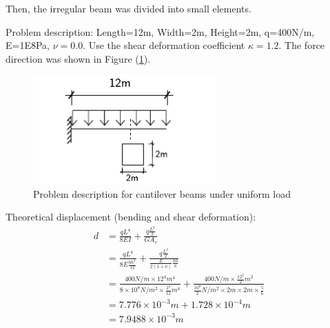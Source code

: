 \documentclass[fleqn,11pt]{article}
\begin{document}
\newpage
Then, the irregular beam was divided into small elements. 


Problem description: Length=12m, Width=2m, Height=2m, q=400N/m, E=1E8Pa, $\nu=0.0$. Use the shear deformation coefficient $\kappa=1.2$. The force direction was shown in Figure (\ref{fig Problem description for cantilever beams under uniform pressure}). 

\begin{figure}[H]
  \centering
  \includegraphics[width=7cm]{../Figure-files/cantilever_12_uniform_load.pdf}
  \caption{Problem description for cantilever beams under uniform load  }
  \label{fig Problem description for cantilever beams under uniform pressure}
\end{figure}


Theoretical displacement (bending and shear deformation):
\begin{equation}
  \begin{aligned}
  d &=\frac{qL^4}{8EI} + \frac{q \frac{L^2}{2}}{GA_v} \\ 
    &=\frac{qL^4}{8E\frac{bh^3}{12} }+\frac{q \frac{L^2}{2}}{\frac{E}{2(1+\nu)}\frac{bh}{\kappa}} \\
    &= \frac{400 N/m \times 12^4 m^4}{8\times 10^8 N/m^2 \times \frac{2^4}{12} m^4} 
       + \frac{400 N/m \times \frac{12^2}{2} m^2} {\frac{10^8}{2} N/m^2 \times 2m\times 2m\times \frac{5}{6}} \\ 
    &=7.776\times 10^{-3} m  +1.728\times 10^{-4} m \\
    &=7.9488\times 10^{-3} m
   \end{aligned}
\end{equation}
\end{document}
